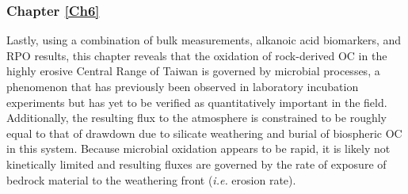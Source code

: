 \subsubsection{Chapter \ref{Ch6}}

Lastly, using a combination of bulk measurements, alkanoic acid biomarkers, and RPO results, this chapter reveals that the oxidation of rock-derived OC in the highly erosive Central Range of Taiwan is governed by microbial processes, a phenomenon that has previously been observed in laboratory incubation experiments but has yet to be verified as quantitatively important in the field. Additionally, the resulting  flux to the atmosphere is constrained to be roughly equal to that of  drawdown due to silicate weathering and burial of biospheric OC in this system. Because microbial oxidation appears to be rapid, it is likely not kinetically limited and resulting  fluxes are governed by the rate of exposure of bedrock material to the weathering front (\textit{i.e.} erosion rate).
